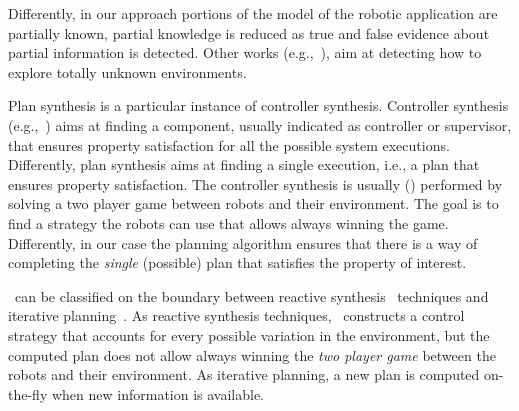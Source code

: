 \begin{enumerate*}
Differently, in our approach portions of the model of the robotic application are partially known,  partial knowledge is reduced as true and false evidence about partial information is detected.
Other works (e.g.,~\cite{7139310}), aim at detecting how to explore totally unknown environments.
\item 
Plan synthesis is a particular instance of controller synthesis. 
Controller  synthesis (e.g.,~\cite{cassandras2009introduction,D'ippolito:2013:SNE:2430536.2430543}) aims at finding a component, usually indicated as controller or supervisor, that ensures property satisfaction for all the possible system executions.
Differently, plan synthesis aims at finding a single execution, i.e., a plan that ensures property satisfaction.
The controller synthesis  is usually (\cite{kress2009temporal,wongpiromsarn2009receding,chen2012ltl,livingston2012backtracking,guo2013revising}) performed by solving a two player game between robots and their environment.
The goal is to find a strategy the robots can use that allows always winning the game.
Differently, in our case the planning algorithm ensures that there is a way of completing the \emph{single} (possible) plan that satisfies the property of interest. 
\item \toolName\ can be classified on the boundary between reactive synthesis~\cite{chen2012ltl,livingston2012backtracking,thomas2002automata} techniques and iterative planning~\cite{guo2013revising,maly2013iterative}. 
As reactive synthesis techniques, \toolName\ constructs a control strategy that accounts for every possible variation in the environment, but the computed plan does not allow always winning the  \emph{two player game} between the robots and their environment.
As  iterative planning, a new plan is computed on-the-fly when new information is available.
\end{enumerate*}
